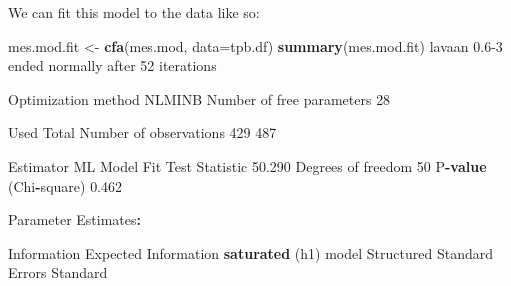 \documentclass[]{article}
\newenvironment{Shaded}{\begin{snugshade}}{\end{snugshade}}
\newcommand{\DataTypeTok}[1]{\textcolor[rgb]{0.13,0.29,0.53}{#1}}
\newcommand{\DecValTok}[1]{\textcolor[rgb]{0.00,0.00,0.81}{#1}}
\newcommand{\FloatTok}[1]{\textcolor[rgb]{0.00,0.00,0.81}{#1}}
\newcommand{\KeywordTok}[1]{\textcolor[rgb]{0.13,0.29,0.53}{\textbf{#1}}}
\newcommand{\NormalTok}[1]{#1}
\newcommand{\OperatorTok}[1]{\textcolor[rgb]{0.81,0.36,0.00}{\textbf{#1}}}
\newcommand{\StringTok}[1]{\textcolor[rgb]{0.31,0.60,0.02}{#1}}
\begin{document}
We can fit this model to the data like so:

\begin{Shaded}
\begin{Highlighting}[]
\NormalTok{mes.mod.fit <-}\StringTok{ }\KeywordTok{cfa}\NormalTok{(mes.mod, }\DataTypeTok{data=}\NormalTok{tpb.df)}
\KeywordTok{summary}\NormalTok{(mes.mod.fit)}
\NormalTok{lavaan }\FloatTok{0.6}\DecValTok{-3}\NormalTok{ ended normally after }\DecValTok{52}\NormalTok{ iterations}

\NormalTok{  Optimization method                           NLMINB}
\NormalTok{  Number of free parameters                         }\DecValTok{28}

\NormalTok{                                                  Used       Total}
\NormalTok{  Number of observations                           }\DecValTok{429}         \DecValTok{487}

\NormalTok{  Estimator                                         ML}
\NormalTok{  Model Fit Test Statistic                      }\FloatTok{50.290}
\NormalTok{  Degrees of freedom                                }\DecValTok{50}
\NormalTok{  P}\OperatorTok{-}\KeywordTok{value}\NormalTok{ (Chi}\OperatorTok{-}\NormalTok{square)                           }\FloatTok{0.462}

\NormalTok{Parameter Estimates}\OperatorTok{:}

\StringTok{  }\NormalTok{Information                                 Expected}
\NormalTok{  Information }\KeywordTok{saturated}\NormalTok{ (h1) model          Structured}
\NormalTok{  Standard Errors                             Standard}


\end{Highlighting}
\end{Shaded}
\end{document}
